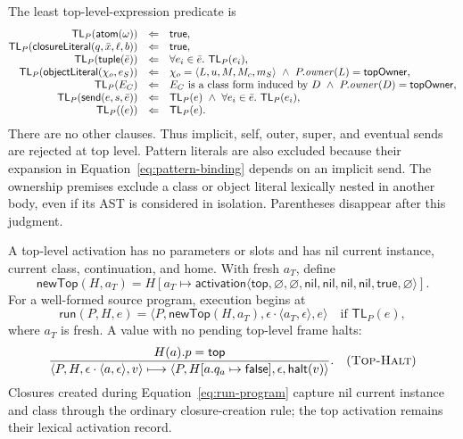 \documentclass[11pt]{article}
\numberwithin{equation}{section}
\newcommand{\kw}[1]{\ensuremath{\mathsf{#1}}}
\newcommand{\nil}{\kw{nil}}
\newcommand{\rulelabel}[1]{\textsc{#1}}
\begin{document}
The least top-level-expression predicate is
\begin{equation}\label{eq:top-level-expression}
\begin{array}{@{}rcl@{}}
 \mathsf{TL}_P(\kw{atom}(\omega))&\Leftarrow&\kw{true},\\
 \mathsf{TL}_P(\kw{closureLiteral}(q,\bar x,\ell,b))&\Leftarrow&\kw{true},\\
 \mathsf{TL}_P(\kw{tuple}(\bar e))&\Leftarrow&
   \forall e_i\in\bar e.\ \mathsf{TL}_P(e_i),\\
 \mathsf{TL}_P(\kw{objectLiteral}(\chi_o,e_S))
   &\Leftarrow&\chi_o=\langle L,u,M,M_c,m_S\rangle\ \land\
     P.\mathit{owner}(L)=\kw{topOwner},\\
 \mathsf{TL}_P(E_C)&\Leftarrow&
   E_C\text{ is a class form induced by }D\ \land\
   P.\mathit{owner}(D)=\kw{topOwner},\\
 \mathsf{TL}_P(\kw{send}(e,s,\bar e))&\Leftarrow&
   \mathsf{TL}_P(e)\ \land\
   \forall e_i\in\bar e.\ \mathsf{TL}_P(e_i),\\
 \mathsf{TL}_P((e))&\Leftarrow&\mathsf{TL}_P(e).
\end{array}
\end{equation}
There are no other clauses.  Thus implicit, self, outer, super, and eventual
sends are rejected at top level.  Pattern literals are also excluded because
their expansion in Equation~\eqref{eq:pattern-binding} depends on an implicit
send.  The ownership premises exclude a class
or object literal lexically nested in another body, even if its AST is
considered in isolation.  Parentheses disappear after this judgment.

A top-level activation has no parameters or slots and has nil current
instance, current class, continuation, and home.  With fresh $a_T$, define
\begin{equation}\label{eq:new-top-activation}
 \mathsf{newTop}(H,a_T)=H[a_T\mapsto\kw{activation}\langle
 \kw{top},\varnothing,\varnothing,\nil,\nil,\nil,\nil,
 \kw{true},\varnothing\rangle].
\end{equation}
For a well-formed source program, execution begins at
\begin{equation}\label{eq:run-program}
 \mathsf{run}(P,H,e)=
 \langle P,\mathsf{newTop}(H,a_T),
   \epsilon\cdot\langle a_T,\epsilon\rangle,e\rangle
 \quad\text{if }\mathsf{TL}_P(e),
\end{equation}
where $a_T$ is fresh.  A value with no pending top-level frame halts:
\[
\dfrac{H(a).p=\kw{top}}
 {\langle P,H,\epsilon\cdot\langle a,\epsilon\rangle,v\rangle
  \longmapsto
  \langle P,H[a.q_a\mapsto\kw{false}],\epsilon,
       \kw{halt}(v)\rangle}.
\quad(\rulelabel{Top-Halt})
\]
Closures created during Equation~\eqref{eq:run-program} capture nil current
instance and class through the ordinary closure-creation rule; the top
activation remains their lexical activation record.
\end{document}
